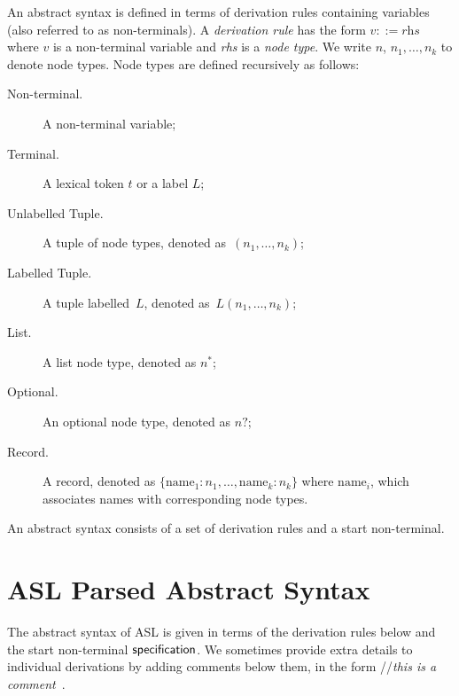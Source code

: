 \documentclass{book}
\begin{document}
An abstract syntax is defined in terms of derivation rules containing variables (also referred to as non-terminals).
%
A \emph{derivation rule} has the form $v ::= \textit{rhs}$ where $v$ is a non-terminal variable and \textit{rhs} is a \emph{node type}. We write $n$, $n_1,\ldots,n_k$ to denote node types.
%
Node types are defined recursively as follows:
\begin{description}
\item[Non-terminal.] A non-terminal variable;
\item[Terminal.] A lexical token $t$ or a label $L$;
\item[Unlabelled Tuple.] A tuple of node types, denoted as~$(n_1,\ldots,n_k)$;
\item[Labelled Tuple.] A tuple labelled~$L$, denoted as~$L(n_1,\ldots,n_k)$;
\item[List.] A list node type, denoted as $n^{*}$;
\item[Optional.] An optional node type, denoted as $n?$;
\item[Record.] A record, denoted as $\{\text{name}_1 : n_1,\ldots,\text{name}_k : n_k\}$ where $\text{name}_i$, which associates names with corresponding node types.
\end{description}

\newpage

An abstract syntax consists of a set of derivation rules and a start non-terminal.

\newcommand\ASTComment[1]{//\quad\textit{#1}\ }

\section{ASL Parsed Abstract Syntax}

The abstract syntax of ASL is given in terms of the derivation rules below and the start non-terminal $\textsf{specification}$.
%
We sometimes provide extra details to individual derivations by adding comments below them, in the form \ASTComment{this is a comment}.
\end{document}
